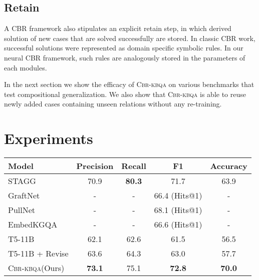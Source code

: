 \documentclass{article}
\newcommand{\alg}{\textsc{Cbr-kbqa}\xspace}
\begin{document}
\subsection{Retain}
\label{sub:retain}
A CBR framework also stipulates an explicit retain step, in which derived solution of new cases that are solved successfully are stored. In classic CBR work, successful solutions were represented as domain specific symbolic rules. In our neural CBR framework, such rules are analogously stored in the parameters of each modules.

In the next section we show the efficacy of \alg on various benchmarks that test compositional generalization. We also show that \alg is able to reuse newly added cases containing unseen relations without any re-training. 

 
\section{Experiments}
\label{sec:experiments}
\begin{table*}[ht]
\centering
    \begin{tabular}{l c c c c}
    \toprule
    Model & Precision & Recall & F1 & Accuracy\\\midrule
    STAGG \cite{yih2016value} & 70.9 & \textbf{80.3} & 71.7 & 63.9\\
GraftNet \cite{sun2018open} & - & - & 66.4 (Hits@1) & - \\
    PullNet \cite{sun2019pullnet} & - & - & 68.1 (Hits@1) & - \\
    EmbedKGQA \cite{saxena2020improving} & - & - & 66.6 (Hits@1) & - \\\midrule
    T5-11B \cite{t5} &62.1 & 62.6& 61.5& 56.5\\
    T5-11B + Revise &63.6 & 64.3& 63.0& 57.7\\
    \alg (Ours) & \textbf{73.1} & 75.1 & \textbf{72.8} & \textbf{70.0}\\\bottomrule
    
    \end{tabular}
    \caption{Performance on the WebQSP dataset. GraftNet, PullNet and EmbedKGQA produces a ranking of KG entities hence evaluation is in Hits@k (see text for description). \alg significantly outperforms baseline models in the strict exact match accuracy metric.}
    \label{tab:webqsp_results}
\end{table*}
\end{document}
